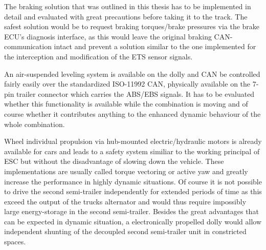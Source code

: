 \documentclass[ExampleMasters.tex]{subfiles}
\begin{document}
The braking solution that was outlined in this thesis has to be implemented in detail and evaluated with great  precautions before taking it to the track. The safest solution would be to request braking torques/brake pressures via the brake \gls{ECU}'s diagnosis interface, as this would leave the original braking CAN-communication intact and prevent a solution similar to the one implemented for the interception and modification of the \gls{ETS} sensor signals. 

An air-suspended leveling system is available on the dolly and \gls{CAN} be controlled fairly easily over the standardized ISO-11992 CAN, physically available on the 7-pin trailer connector which carries the \gls{ABS}/\gls{EBS} signals. It has to be evaluated whether this functionality is available while the combination is moving and of course whether it contributes anything to the enhanced dynamic behaviour of the whole combination. 

Wheel individual propulsion via hub-mounted electric/hydraulic motors is already available for cars and leads to a safety system similiar to the working principal of \gls{ESC} but without the disadvantage of slowing down the vehicle. These implementations are usually called torque vectoring or active yaw and greatly increase the performance in highly dynamic situations. Of course it is not possible to drive the second semi-trailer independently for extended periods of time as this exceed the output of the trucks alternator and would thus require impossibly large energy-storage in the second semi-trailer. Besides the great advantages that can be expected in dynamic situation, a electronically propelled dolly would allow independent shunting of the decoupled second semi-trailer unit in constricted spaces. 
\end{document}
